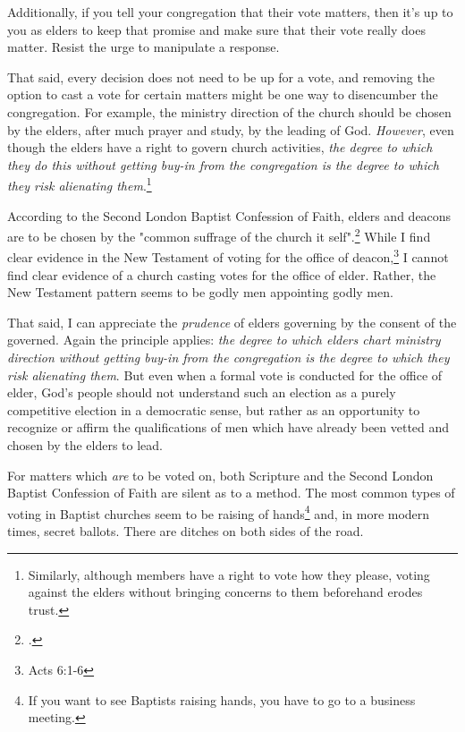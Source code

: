 Additionally, if you tell your congregation that their vote matters, then it's up to you as elders to keep that promise and make sure that their vote really does matter.  Resist the urge to manipulate a response.  

That said, every decision does not need to be up for a vote, and removing the option to cast a vote for certain matters might be one way to disencumber the congregation. For example, the ministry direction of the church should be chosen by the elders, after much prayer and study, by the leading of God.  \textit{However}, even though the elders have a right to govern church activities, \textit{the degree to which they do this without getting buy-in from the congregation is the degree to which they risk alienating them}.\footnote{Similarly, although members have a right to vote how they please, voting against the elders without bringing concerns to them beforehand erodes trust.}

According to the Second London Baptist Confession of Faith, elders and deacons are to be chosen by the "common suffrage of the church it self".\footcite[Chapter 26, Paragraph 9]{london1689}  While I find clear evidence in the New Testament of voting for the office of deacon,\footnote{Acts 6:1-6} I cannot find clear evidence of a church casting votes for the office of elder.  Rather, the New Testament pattern seems to be godly men appointing godly men.  

That said, I can appreciate the \textit{prudence} of elders governing by the consent of the governed.  Again the principle applies: \textit{the degree to which elders chart ministry direction without getting buy-in from the congregation is the degree to which they risk alienating them}.  But even when a formal vote is conducted for the office of elder, God's people should not understand such an election as a purely competitive election in a democratic sense, but rather as an opportunity to recognize or affirm the qualifications of men which have already been vetted and chosen by the elders to lead.

For matters which \textit{are} to be voted on, both Scripture and the Second London Baptist Confession of Faith are silent as to a method.  The most common types of voting in Baptist churches seem to be raising of hands\footnote{If you want to see Baptists raising hands, you have to go to a business meeting.} and, in more modern times, secret ballots.  There are ditches on both sides of the road.


